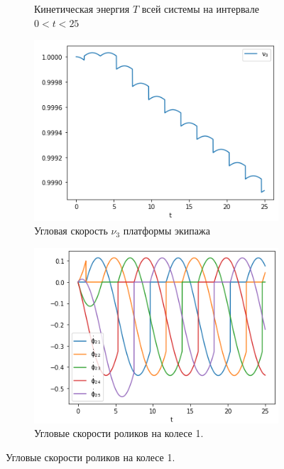 \begin{figure}[htb]
\begin{subfigure}[t]{\textwidth}
            \vspace{-25pt}
            \caption{Кинетическая энергия $T$ всей системы на интервале $0 < t < 25$}
            \label{fig:self_rot_T}
        \end{subfigure}
    \endminipage
    \quad
        \vspace{-20pt}
        \begin{subfigure}[t]{\textwidth}
            \centering
            \includegraphics[width=\linewidth]{content/pic/new/impact/impact_1_nu3.png}
            \vspace{-25pt}
            \caption{Угловая скорость $\nu_3$ платформы экипажа}
            \label{fig:self_rot_nu3}
        \end{subfigure}
        \begin{subfigure}[t]{\textwidth}
            \vspace{20pt}
            \centering
            \includegraphics[width=\linewidth]{content/pic/new/impact/impact_1_dphi.png}
            \vspace{-25pt}
            \caption{Угловые скорости роликов на колесе 1.}
            \label{fig:self_rot_dphi}
        \end{subfigure}
    \endminipage


\end{figure}
